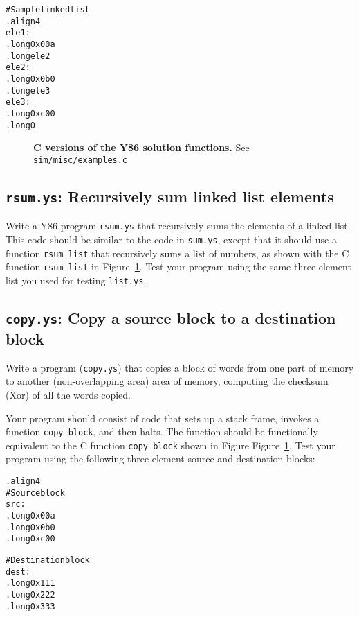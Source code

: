 \documentclass[11pt]{article}
\newcommand{\mycaption}[2]{\caption[#1]{\small \textsf{\textbf{#1} #2}}}
\newenvironment{ccode}%
{\small}%
{}
\newenvironment{codefrag}%
{\small\begin{alltt}}%
{\end{alltt}%
}
\begin{document}
\begin{codefrag}
# Sample linked list
.align 4
ele1:
        .long 0x00a
        .long ele2
ele2:
        .long 0x0b0
        .long ele3
ele3:
        .long 0xc00
        .long 0
\end{codefrag} 

\begin{figure}
\begin{ccode}

\end{ccode}
\mycaption{C versions of the Y86 solution functions.}
{See \texttt{sim/misc/examples.c}}
\label{fig:examples}
\end{figure}

\subsection*{\texttt{rsum.ys}: Recursively sum linked list elements}

Write a Y86 program 
\texttt{rsum.ys} that recursively sums the elements of a linked
list.  This code should be similar to the code in \texttt{sum.ys},
except that it should use a function \texttt{rsum\_list} that
recursively sums a list of numbers, as shown with the C function
\texttt{rsum\_list} in 
Figure~\ref{fig:examples}.  Test your
program using the same three-element list you used for testing
\texttt{list.ys}.

\subsection*{\texttt{copy.ys}: Copy a source block to a destination block}

Write a program (\texttt{copy.ys}) that copies a block of words
from one part of memory to another (non-overlapping area) area of
memory, computing the checksum (Xor) of all the words copied.

Your program should consist of code that sets up a stack frame,
invokes a function \texttt{copy\_block}, and then halts.  The function
should be functionally equivalent to the C function
\texttt{copy\_block} shown in Figure
Figure~\ref{fig:examples}.  Test your
program using the following three-element source and destination
blocks:

\begin{codefrag}
.align 4
# Source block
src:
        .long 0x00a
        .long 0x0b0
        .long 0xc00

# Destination block
dest:
        .long 0x111
        .long 0x222
        .long 0x333
\end{codefrag}
\end{document}
